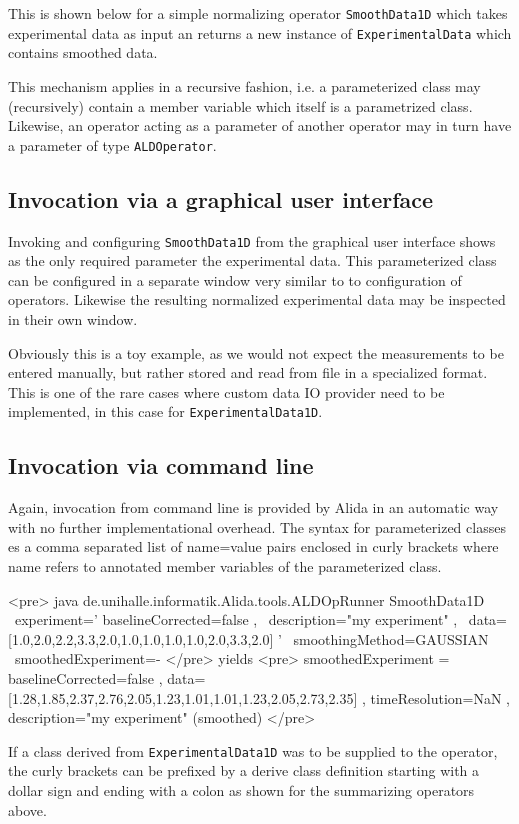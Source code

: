 \renewcommand{\codefile}{../../../../../../src/main/java/de/unihalle/informatik/Alida/demo/ExperimentalData1D.java}
\setcounter{off}{54}

This is shown below for a simple normalizing operator \lstinline+SmoothData1D+
which takes experimental data as input an returns a new instance
of \lstinline+ExperimentalData+ which contains smoothed data.

\renewcommand{\codefile}{../../../../../../src/main/java/de/unihalle/informatik/Alida/demo/SmoothData1D.java}
\setcounter{off}{54}


This mechanism applies in a recursive fashion, i.e. a parameterized class may
(recursively) contain a member variable which itself is a parametrized class.
Likewise, an operator acting as a parameter of another operator
may in turn have a parameter of type \lstinline+ALDOperator+.

\subsection{  Invocation via a graphical user interface}

Invoking and configuring \lstinline+SmoothData1D+ from the graphical user interface
shows as the only required parameter the experimental data.
This parameterized class can be configured in a separate  window
very similar to to configuration of operators.
Likewise the resulting normalized experimental data
may be inspected in their own window.

Obviously this is a toy example, as we would not expect the measurements to
be entered manually, but rather stored and read from file in a specialized format.
This is one of the rare cases where 
custom data IO provider need to be implemented, in this
case for \lstinline+ExperimentalData1D+.


\subsection{  Invocation via command line}

Again, invocation from command line is provided by Alida in an automatic
way with no further implementational overhead.
The syntax for parameterized classes es a comma separated list of name=value pairs
enclosed in curly brackets where name refers to annotated member variables of
the parameterized class.

<pre>
java de.unihalle.informatik.Alida.tools.ALDOpRunner SmoothData1D \
	experiment='{ baselineCorrected=false , \
                      description="my experiment" , \
                      data=[1.0,2.0,2.2,3.3,2.0,1.0,1.0,1.0,1.0,2.0,3.3,2.0] }' \
        smoothingMethod=GAUSSIAN \
	smoothedExperiment=-
</pre>
yields
<pre>
smoothedExperiment = { baselineCorrected=false , 
    data=[1.28,1.85,2.37,2.76,2.05,1.23,1.01,1.01,1.23,2.05,2.73,2.35] , 
    timeResolution=NaN , 
    description="my experiment" (smoothed) }
</pre>

If a class derived from \lstinline+ExperimentalData1D+ was to be supplied to the operator,
the curly brackets can be prefixed by a derive class definition starting with a dollar sign
and ending with a colon as shown for the summarizing operators above.
